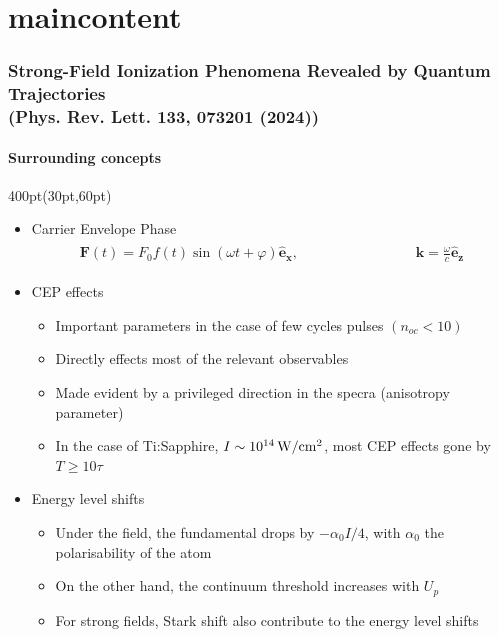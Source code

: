 
\section{maincontent}

\begin{frame}
\frametitle{Strong-Field Ionization Phenomena Revealed by Quantum Trajectories \\
\small (Phys. Rev. Lett. \textbf{133}, 073201 (2024))}
\framesubtitle{Surrounding concepts}


\footnotesize
 
\begin{textblock*}{400pt}(30pt,60pt)
\begin{itemize}
\item Carrier Envelope Phase
\begin{align}
\begin{split}
 \boldsymbol{F}(t) = F_0 f(t) \sin \left( \omega t + \varphi\right)
   \boldsymbol{\hat{e}_x}, \hspace{100pt} 
\boldsymbol{k} = \frac{\omega}{c}\boldsymbol{\hat{e}_z}
\end{split}
 \nonumber 
\end{align}
\item CEP effects
\begin{itemize}
\footnotesize
 \item[$\bullet$] Important parameters in the case of few cycles pulses
$(n_{oc} < 10 )$
 \item[$\bullet$] Directly effects most of the relevant observables
 \item[$\bullet$] Made evident by a privileged direction 
in the specra (anisotropy parameter)
 \item[$\bullet$] In the case of Ti:Sapphire, $I \sim 10^{14}\,{\rm W/cm^2}$,
most CEP effects gone by $T\geqslant 10\tau$
\end{itemize}
\item Energy level shifts
\begin{itemize}
\footnotesize
 \item[$\bullet$] Under the field, the fundamental drops 
by $-\alpha_0I/4$, with $\alpha_0$ the polarisability of the atom
 \item[$\bullet$] On the other hand, 
the continuum threshold increases with $U_p$
 \item[$\bullet$] For strong fields, Stark shift also contribute to the 
energy level shifts


\end{itemize}
\end{itemize}
\end{textblock*}
\end{frame}
